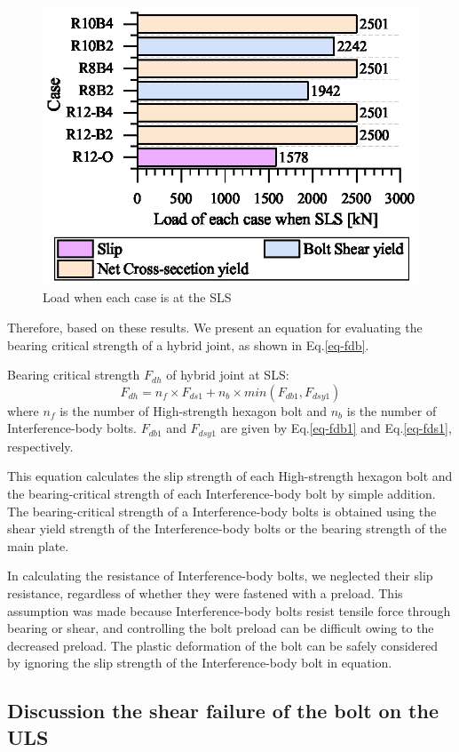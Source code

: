 \begin{figure}[htbp]
    \centering
    \includegraphics[width=0.65\linewidth]{imgs/ch5/P-SLS.eps}
    \caption{Load when each case is at the SLS}
    \label{fig-PSLS}
\end{figure}


Therefore, based on these results. We present an equation for evaluating the bearing critical strength of a hybrid joint, as shown in Eq.\ref{eq-fdb}. 

\noindent Bearing critical strength $F_{dh}$ of hybrid joint at SLS:
\begin{equation}
    \label{eq-fdb}
    F_{dh}= n_f \times F_{ds1} + n_b\times min(F_{db1}, F_{dsy1})
\end{equation}
where $n_{f}$ is the number of High-strength hexagon bolt and $n_b$ is the number of Interference-body bolts. $F_{db1}$ and $F_{dsy1}$ are given by Eq.\ref{eq-fdb1} and Eq.\ref{eq-fds1}, respectively.

This equation calculates the slip strength of each High-strength hexagon bolt and the bearing-critical strength of each Interference-body bolt by simple addition. The bearing-critical strength of a Interference-body bolts is obtained using the shear yield strength of the Interference-body bolts or the bearing strength of the main plate.

In calculating the resistance of Interference-body bolts, we neglected their slip resistance, regardless of whether they were fastened with a preload. This assumption was made because Interference-body bolts resist tensile force through bearing or shear, and controlling the bolt preload can be difficult owing to the decreased preload. The plastic deformation of the bolt can be safely considered by ignoring the slip strength of the Interference-body bolt in equation.


\subsection{Discussion the shear failure of the bolt on the ULS}

